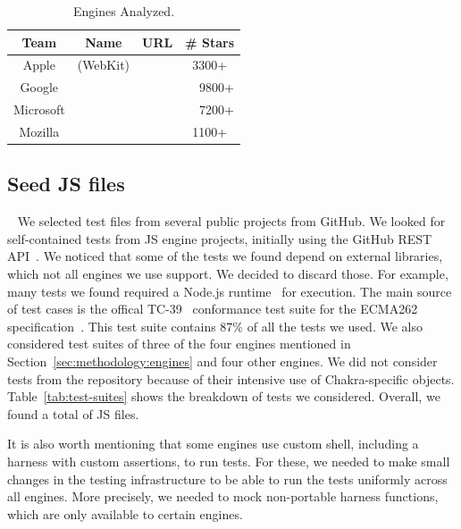 \documentclass[10pt,conference,anonymous]{IEEEtran}
\begin{document}
\begin{table}[t]
  \centering
  \caption{\label{tab:engines}Engines Analyzed.}
  \begin{tabular}{cccr}
    \toprule
    Team & Name & URL & \# Stars \\
    \midrule
    Apple & \jsc{} (WebKit) & \cite{jsc2018repo} & \multicolumn{1}{c}{3300+} \\
    Google & \veight{} & \cite{v82018repo} & 9800+ \\
    Microsoft & \chakra{} & \cite{chakra2018repo} & 7200+ \\
    Mozilla & \smonkey{} & \cite{spidermonkey2018repo} & \multicolumn{1}{c}{1100+} \\
   \bottomrule     
  \end{tabular}
\end{table}

\subsection{Seed JS files\label{sec:seeds}}~
We selected test files from several public projects from GitHub. We
looked for self-contained tests from JS engine projects, initially
using the GitHub REST API~\cite{github-rest-api}. We noticed that some
of the tests we found depend on external libraries, which not all
engines we use support. We decided to discard those. For example, many
tests we found required a Node.js runtime~\cite{node} for
execution. The main source of test cases is the offical
TC-39~\cite{tc39-github} conformance test suite for the ECMA262
specification~\cite{ecmas262-spec}. This test suite contains 87\% of
all the tests we used. We also considered test suites of three of the
four engines mentioned in Section~\ref{sec:methodology:engines} and
four other engines. We did not consider tests from the \chakra{}
repository because of their intensive use of Chakra-specific
objects. Table~\ref{tab:test-suites} shows the breakdown of tests we
considered. Overall, we found a total of \totfiles{} JS files.

It is also worth mentioning that some engines use custom shell,
including a harness with custom assertions, to run tests.  For these,
we needed to make small changes in the testing infrastructure to be
able to run the tests uniformly across all engines. More precisely, we
needed to mock non-portable harness functions, which are only
available to certain engines.
\end{document}
